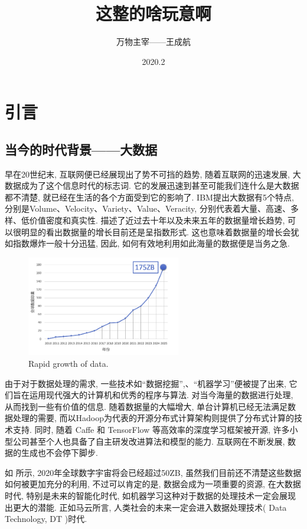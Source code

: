 \documentclass[lang=cn,11pt,a4paper]{elegantpaper}
\title{这整的啥玩意啊}
\author{万物主宰——王成航}
\date{2020.2}
\begin{document}
\maketitle
\tableofcontents
\thispagestyle{empty}
\newpage
{}
\section{引言}
\subsection{当今的时代背景——大数据}
\par 早在20世纪末, 互联网便已经展现出了势不可挡的趋势, 随着互联网的迅速发展, 大数据成为了这个信息时代的标志词. 它的发展迅速到甚至可能我们连什么是大数据都不清楚, 就已经在生活的各个方面受到它的影响了. IBM提出大数据有5个特点, 分别是Volume、Velocity、Variety、Value、Veracity, 分别代表着大量、高速、多样、低价值密度和真实性.  描述了近过去十年以及未来五年的数据量增长趋势, 可以很明显的看出数据量的增长目前还是呈指数形式. 这也意味着数据量的增长会犹如指数爆炸一般十分迅猛, 因此, 如何有效地利用如此海量的数据便是当务之急. 
\begin{figure}[htbp]
	\centering
	\includegraphics[width=0.6\textwidth]{Bigdata}
  	\caption{Rapid growth of data.\label{fig:data}}
\end{figure}
\par 由于对于数据处理的需求, 一些技术如“数据挖掘”,、“机器学习”便被提了出来, 它们旨在运用现代强大的计算机和优秀的程序与算法. 对当今海量的数据进行处理, 从而找到一些有价值的信息. 随着数据量的大幅增大, 单台计算机已经无法满足数据处理的需要, 而以Hadoop为代表的开源分布式计算架构则提供了分布式计算的技术支持. 同时, 随着 Caffe 和 TensorFlow 等高效率的深度学习框架被开源, 许多小型公司甚至个人也具备了自主研发改进算法和模型的能力. 互联网在不断发展, 数据的生成也不会停下脚步. 
\par 如 所示, 2020年全球数字宇宙将会已经超过50ZB, 虽然我们目前还不清楚这些数据如何被更加充分的利用, 不过可以肯定的是, 数据会成为一项重要的资源, 在大数据时代, 特别是未来的智能化时代, 如机器学习这种对于数据的处理技术一定会展现出更大的潜能. 正如马云所言, 人类社会的未来一定会进入数据处理技术( Data Technology, DT )时代.
\end{document}
